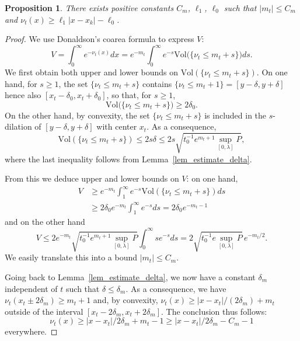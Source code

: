 \documentclass[10pt]{amsart}
\theoremstyle{plain}
\newtheorem{prop}[thm]{Proposition}
\theoremstyle{definition}
\begin{document}
\begin{prop}
\label{prop_m_t}
There exists positive constants $C_m$, $\ell_1$, $\ell_0$ such
that $|m_t|\leq C_m$ and $\nu_t(x)\geq \ell_1|x-x_k|-\ell_0$.
\end{prop}

\begin{proof}
We use Donaldson's coarea formula \cite{Don08} to express $V$:
\begin{equation*}
V= \int_0^{\infty} e^{-\nu_t(x)}dx = e^{-m_t} \int_0^{\infty}e^{-s}\mathrm{Vol}\bigl(\{\nu_t\leq m_t+s\}\bigr) ds.
\end{equation*}
We first obtain both upper and lower bounds on $\mathrm{Vol}(\{\nu_t\leq m_t+s\})$.
On one hand, for $s\geq 1$, the set $\{\nu_t\leq m_t+s\}$ contains
$\{\nu_t\leq m_t+1\}=[y-\delta,y+\delta]$
hence also $[x_t-\delta_0,x_t+\delta_0]$, so that, for $s\geq 1$,
\begin{equation*}
\mathrm{Vol} \bigl(\{\nu_t\leq m_t+s\} \bigr)\geq 2\delta_0.
\end{equation*}
On the other hand, by convexity, the set $\{\nu_t\leq m_t+s\}$ is included in
the $s$-dilation of $[y-\delta,y+\delta]$ with center $x_t$.
As a consequence,
\begin{equation*}
\mathrm{Vol}(\{\nu_t\leq m_t+s\})\leq 2s\delta \leq 2s\sqrt{t_0^{-1}e^{m_t+1}\sup_{[0,\lambda]}P},
\end{equation*}
where the last inequality follows from Lemma~\ref{lem_estimate_delta}.

From this we deduce upper and lower bounds on $V$: on one hand,
\begin{align*}
V& \geq e^{-m_t} \int_1^{\infty}e^{-s}\mathrm{Vol}(\{\nu_t\leq m_t+s\}) ds\\
&\geq 2\delta_0 e^{-m_t} \int_1^{\infty}e^{-s}ds = 2\delta_0e^{-m_t-1}
\end{align*}
and on the other hand
\begin{equation*}
V\leq 2e^{-m_t}\sqrt{t_0^{-1}e^{m_t+1}\sup_{[0,\lambda]}P}\int_0^{\infty}se^{-s}ds
=2\sqrt{t_0^{-1}e\sup_{[0,\lambda]}P}\,e^{-m_t/2}.
\end{equation*}
We easily translate this into a bound $|m_t|\leq C_m$.

Going back to Lemma~\ref{lem_estimate_delta}, we now have a constant
$\delta_m$ independent of $t$ such that $\delta\leq \delta_m$.
As a consequence, we have $\nu_t(x_t\pm 2\delta_m)\geq m_t+1$ and, by convexity,
$\nu_t(x)\geq |x-x_t|/(2\delta_m)+m_t$
outside of the interval $[x_t-2\delta_m,x_t+2\delta_m]$.
The conclusion thus follows:
\begin{equation*}
\nu_t(x)\geq |x-x_t|/2\delta_m+m_t-1 \geq |x-x_t|/2\delta_m-C_m-1
\end{equation*}
everywhere.
\end{proof}
\end{document}
